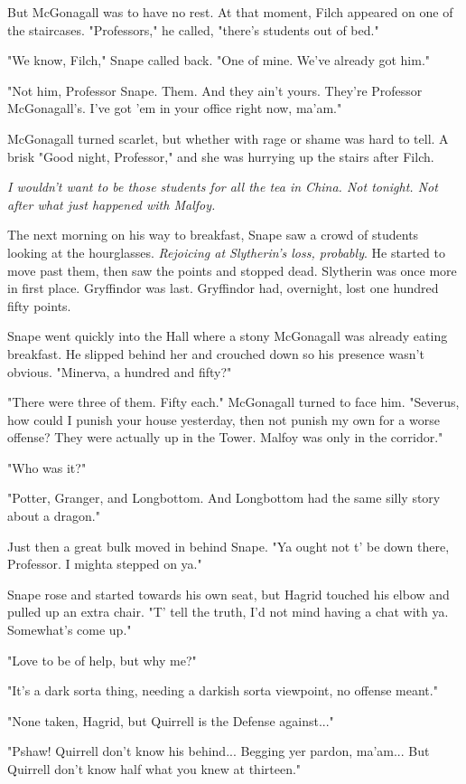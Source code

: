 \documentclass[a4paper,11pt]{article}
\begin{document}
But McGonagall was to have no rest. At that moment, Filch appeared on one of the staircases. "Professors," he called, "there's students out of bed."

"We know, Filch," Snape called back. "One of mine. We've already got him."

"Not him, Professor Snape. Them. And they ain't yours. They're Professor McGonagall's. I've got 'em in your office right now, ma'am."

McGonagall turned scarlet, but whether with rage or shame was hard to tell. A brisk "Good night, Professor," and she was hurrying up the stairs after Filch.

\emph{I wouldn't want to be those students for all the tea in China. Not tonight. Not after what just happened with Malfoy.}

The next morning on his way to breakfast, Snape saw a crowd of students looking at the hourglasses. \emph{Rejoicing at Slytherin's loss, probably}. He started to move past them, then saw the points and stopped dead. Slytherin was once more in first place. Gryffindor was last. Gryffindor had, overnight, lost one hundred fifty points.

Snape went quickly into the Hall where a stony McGonagall was already eating breakfast. He slipped behind her and crouched down so his presence wasn't obvious. "Minerva, a hundred and fifty?"

"There were three of them. Fifty each." McGonagall turned to face him. "Severus, how could I punish your house yesterday, then not punish my own for a worse offense? They were actually up in the Tower. Malfoy was only in the corridor."

"Who was it?"

"Potter, Granger, and Longbottom. And Longbottom had the same silly story about a dragon."

Just then a great bulk moved in behind Snape. "Ya ought not t' be down there, Professor. I mighta stepped on ya."

Snape rose and started towards his own seat, but Hagrid touched his elbow and pulled up an extra chair. "T' tell the truth, I'd not mind having a chat with ya. Somewhat's come up."

"Love to be of help, but why me?"

"It's a dark sorta thing, needing a darkish sorta viewpoint, no offense meant."

"None taken, Hagrid, but Quirrell is the Defense against..."

"Pshaw! Quirrell don't know his behind... Begging yer pardon, ma'am... But Quirrell don't know half what you knew at thirteen."
\end{document}
